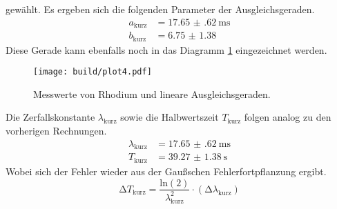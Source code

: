 gewählt.
Es ergeben sich die folgenden Parameter der Ausgleichsgeraden.
\begin{align}
a_{\text{kurz}} &= \SI{17.65(62)}{\milli\second}\\
b_{\text{kurz}} &= \SI{6.75(138)}{}
\end{align}
Diese Gerade kann ebenfalls noch in das Diagramm \ref{fig:plot4} eingezeichnet werden.
\begin{figure}[ht!]
  \centering
  \texttt{[image: build/plot4.pdf]}
  \caption{Messwerte von Rhodium und lineare Ausgleichsgeraden.}
  \label{fig:plot4}
\end{figure}
Die Zerfallskonstante $\lambda_{\text{kurz}}$ sowie die Halbwertszeit $T_{\text{kurz}}$ folgen analog zu den vorherigen Rechnungen.
\begin{align}
\lambda_{\text{kurz}} &= \SI{17.65(62)}{\milli\second} \\
T_{\text{kurz}} &= \SI{39.27(138)}{\second} 
\end{align}
Wobei sich der Fehler wieder aus der Gaußschen Fehlerfortpflanzung ergibt.
\begin{equation}
\increment T_{\text{kurz}} = \frac{\text{ln}(2)}{\lambda_{\text{kurz}}^{2}} \cdot (\increment \lambda_{\text{kurz}})
\end{equation}